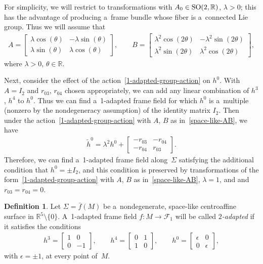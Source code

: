 \documentclass[pdftex]{sigma}
\numberwithin{equation}{section}
\theoremstyle{definition}
\newtheorem{dfn}[teo]{Definition}
\begin{document}
For simplicity, we will restrict to transformations with $A_0 \in {\rm SO}(2,\mathbb{R})$, $\lambda > 0$; this has the
advantage of producing a~frame bundle whose f\/iber is a~connected Lie group.
Thus we will assume that
\begin{gather}
A=
\begin{bmatrix}
\lambda \cos (\theta) & -\lambda \sin (\theta)
\\
\lambda \sin (\theta) & \lambda \cos (\theta)
\end{bmatrix},
\qquad
B =
\begin{bmatrix}
\lambda^2 \cos (2\theta) & -\lambda^2 \sin (2\theta)
\\
\lambda^2 \sin (2\theta) & \lambda^2 \cos (2\theta)
\end{bmatrix},
\label{space-like-AB}
\end{gather}
where $\lambda > 0$, $\theta \in \mathbb{R}$.

Next, consider the ef\/fect of the action~\eqref{1-adapted-group-action} on $h^0$.
With $A = I_2$ and $r_{03}$, $r_{04}$ chosen appropriately, we can add any linear combination of $h^3$, $h^4$ to $h^0$.
Thus we can f\/ind a~1-adapted frame f\/ield for which $h^0$ is a~multiple (nonzero by the nondegeneracy assumption) of the
identity matrix $I_2$.
Then under the action~\eqref{1-adapted-group-action} with $A$, $B$ as in~\eqref{space-like-AB}, we have
\begin{gather*}
\tilde{h}^0 = \lambda^2 h^0 +
\begin{bmatrix}
-r_{03} & -r_{04}
\\
-r_{04} & r_{03}
\end{bmatrix}.
\end{gather*}
Therefore, we can f\/ind a~1-adapted frame f\/ield along~$\Sigma$ satisfying the additional condition that $h^0 = \pm I_2$,
and this condition is preserved by transformations of the form~\eqref{1-adapted-group-action} with $A$, $B$ as
in~\eqref{space-like-AB}, $\lambda=1$, and and $r_{03} = r_{04} = 0$.

\begin{dfn}
Let $\Sigma = \bar{f}(M)$ be a~nondegenerate, space-like centroaf\/f\/ine surface in $\mathbb{R}^5 \setminus \{0\}$.
A~1-adapted frame f\/ield $f:M \to \mathcal{F}_1$ will be called {\em $2$-adapted} if it satisf\/ies the conditions
\begin{gather}
h^3 =
\begin{bmatrix}
1 & 0
\\
0 & -1
\end{bmatrix},
\qquad
h^4 =
\begin{bmatrix}
0 & 1
\\
1 & 0
\end{bmatrix},
\qquad
h^0 =
\begin{bmatrix}
\epsilon & 0
\\
0 & \epsilon
\end{bmatrix},
\label{2-adapted-space-like-h}
\end{gather}
with $\epsilon=\pm 1$, at every point of~$M$.
\end{dfn}
\end{document}
